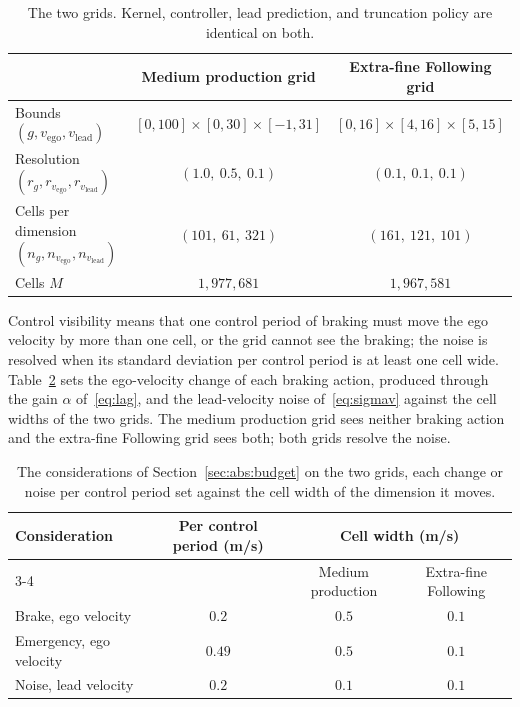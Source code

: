\documentclass[11pt,a4paper]{article}
\newcommand{\vego}{v_{\text{ego}}}
\newcommand{\vlead}{v_{\text{lead}}}
\theoremstyle{plain}
\theoremstyle{remark}
\begin{document}
	\begin{table}[H]
		\centering
		\small
		\begin{tabular}{lcc}
			\toprule
			& Medium production grid & Extra-fine Following grid \\
			\midrule
			Bounds $(g, \vego, \vlead)$ & $[0,100]\times[0,30]\times[-1,31]$ & $[0,16]\times[4,16]\times[5,15]$ \\
			Resolution $(r_g, r_{\vego}, r_{\vlead})$ & $(1.0,\ 0.5,\ 0.1)$ & $(0.1,\ 0.1,\ 0.1)$ \\
			Cells per dimension $(n_g, n_{\vego}, n_{\vlead})$ & $(101,\ 61,\ 321)$ & $(161,\ 121,\ 101)$ \\
			Cells $M$ & $1{,}977{,}681$ & $1{,}967{,}581$ \\
			\bottomrule
		\end{tabular}
		\caption{The two grids. Kernel, controller, lead prediction, and truncation policy are identical on both.}
		\label{tab:grids}
	\end{table}
	
	Control visibility means that one control period of braking must move the
	ego velocity by more than one cell, or the grid cannot see the braking;
	the noise is resolved when its standard deviation per control period is at
	least one cell wide. Table~\ref{tab:considerations} sets the ego-velocity
	change of each braking action, produced through the gain $\alpha$
	of~\eqref{eq:lag}, and the lead-velocity noise of~\eqref{eq:sigmav}
	against the cell widths of the two grids. The medium production grid sees
	neither braking action and the extra-fine Following grid sees both; both
	grids resolve the noise.
	
	\begin{table}[H]
		\centering
		\small
		\begin{tabular}{lccc}
			\toprule
			Consideration & Per control period (m/s) &
			\multicolumn{2}{c}{Cell width (m/s)} \\
			\cmidrule(lr){3-4}
			& & Medium production & Extra-fine Following \\
			\midrule
			Brake, ego velocity & $0.2$ & $0.5$ & $0.1$ \\
			Emergency, ego velocity & $0.49$ & $0.5$ & $0.1$ \\
			Noise, lead velocity & $0.2$ & $0.1$ & $0.1$ \\
			\bottomrule
		\end{tabular}
		\caption{The considerations of Section~\ref{sec:abs:budget} on the two
			grids, each change or noise per control period set against the cell
			width of the dimension it moves.}
		\label{tab:considerations}
	\end{table}
	
\end{document}
